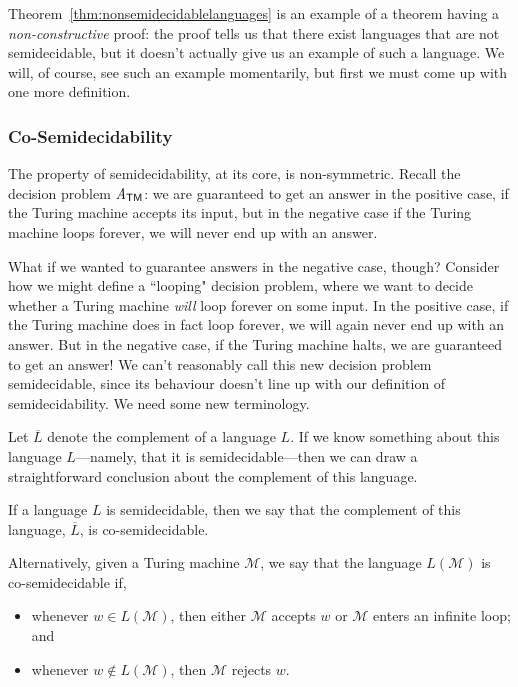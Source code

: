 Theorem~\ref{thm:nonsemidecidablelanguages} is an example of a theorem having a \emph{non-constructive} proof: the proof tells us that there exist languages that are not semidecidable, but it doesn't actually give us an example of such a language. We will, of course, see such an example momentarily, but first we must come up with one more definition.

\subsubsection*{Co-Semidecidability}

The property of semidecidability, at its core, is non-symmetric. Recall the decision problem $\mathit{A}_{\textsf{TM}}$: we are guaranteed to get an answer in the positive case, if the Turing machine accepts its input, but in the negative case if the Turing machine loops forever, we will never end up with an answer.

What if we wanted to guarantee answers in the negative case, though? Consider how we might define a ``looping" decision problem, where we want to decide whether a Turing machine \emph{will} loop forever on some input. In the positive case, if the Turing machine does in fact loop forever, we will again never end up with an answer. But in the negative case, if the Turing machine halts, we are guaranteed to get an answer! We can't reasonably call this new decision problem semidecidable, since its behaviour doesn't line up with our definition of semidecidability. We need some new terminology.

Let $\overline{L}$ denote the complement of a language $L$. If we know something about this language $L$---namely, that it is semidecidable---then we can draw a straightforward conclusion about the complement of this language.

\begin{definition}\label{def:cosemidecidablelanguage}
If a language $L$ is semidecidable, then we say that the complement of this language, $\overline{L}$, is co-semidecidable. \medskip

\noindent
Alternatively, given a Turing machine $\mathcal{M}$, we say that the language $L(\mathcal{M})$ is co-semidecidable if,
\begin{itemize}
\item whenever $w \in L(\mathcal{M})$, then either $\mathcal{M}$ accepts $w$ or $\mathcal{M}$ enters an infinite loop; and
\item whenever $w \not\in L(\mathcal{M})$, then $\mathcal{M}$ rejects $w$.
\end{itemize}
\end{definition}

